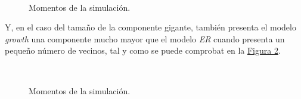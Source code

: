 \documentclass[paper=a4, fontsize=11pt]{article} %
\numberwithin{equation}{section} %
\numberwithin{figure}{section} %
\numberwithin{table}{section} %
\begin{document}
\begin{figure}[H]
    \centering
    \mbox{
        \qquad
    }
    \caption{Momentos de la simulación.}
    \label{imej9}
\end{figure}

Y, en el caso del tamaño de la componente gigante, también presenta el modelo \textit{growth} una componente mucho mayor que el modelo \textit{ER} cuando presenta un pequeño número de vecinos, tal y como se puede comprobat en la \hyperref[imej10]{Figura \ref*{imej10}}.

\begin{figure}[H]
    \centering
    \mbox{
        \qquad
    }
    \caption{Momentos de la simulación.}
    \label{imej10}
\end{figure}
\end{document}
